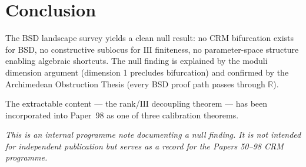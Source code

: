 \documentclass[11pt,a4paper]{article}
\theoremstyle{plain}
\theoremstyle{definition}
\newcommand{\Sha}{\mathrm{III}}
\begin{document}
\section{Conclusion}

The BSD landscape survey yields a clean null result: no CRM bifurcation exists for BSD, no constructive sublocus for $\Sha$ finiteness, no parameter-space structure enabling algebraic shortcuts. The null finding is explained by the moduli dimension argument (dimension 1 precludes bifurcation) and confirmed by the Archimedean Obstruction Thesis (every BSD proof path passes through $\mathbb{R}$).

The extractable content --- the rank/$\Sha$ decoupling theorem --- has been incorporated into Paper~98 as one of three calibration theorems.

\bigskip
\noindent\textit{This is an internal programme note documenting a null finding. It is not intended for independent publication but serves as a record for the Papers 50--98 CRM programme.}
\end{document}
